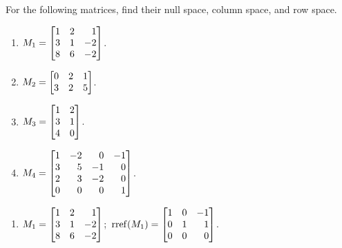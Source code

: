
\begin{exercises}

	\begin{problist}
		\prob For the following matrices, find their null space, column space, and
		row space.
		\begin{enumerate}
			\item $M_{1}=\mat{1&2&1\\3&1&-2\\8&6&-2}$.

			\item $M_{2}=\mat{0&2&1\\3&2&5}$.

			\item $M_{3}=\mat{1&2\\3&1\\4&0}$.

			\item $M_{4}=\mat{1&-2&0&-1\\3&5&-1&0\\2&3&-2&0\\0&0&0&1}$.
		\end{enumerate}


		\begin{solution}

			\begin{enumerate}
				\item $M_{1} = \mat{1&2&1\\3&1&-2\\8&6&-2}$;\, $\rref(M_{1})=\mat{1&0&-1\\0&1&1\\0&0&0}$.
				

\end{enumerate}
\end{solution}
\end{problist}
\end{exercises}
